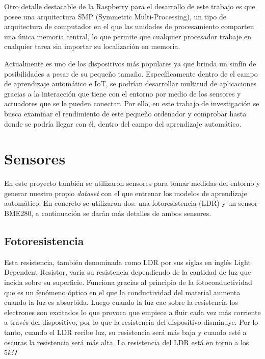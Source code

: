 \documentclass[a4paper, 12pt]{book}
\begin{document}
Otro detalle destacable de la Raspberry para el desarrollo de este trabajo es que posee una arquitectura SMP (Symmetric Multi-Processing), un tipo de arquitectura de computador en el que las unidades de procesamiento comparten una única memoria central, lo que permite que cualquier procesador trabaje en cualquier tarea sin importar su localización en memoria. 

Actualmente es uno de los dispositivos más populares ya que brinda un sinfín de posibilidades a pesar de su pequeño tamaño. Específicamente dentro de el campo de aprendizaje automático e IoT, se podrían desarrollar multitud de aplicaciones gracias a la interacción que tiene con el entorno por medio de los sensores y actuadores que se le pueden conectar. Por ello, en este trabajo de investigación se busca examinar el rendimiento de este pequeño ordenador y comprobar hasta donde se podría llegar con él, dentro del campo del aprendizaje automático. 


\section{Sensores}
\label{sec:sensores}

En este proyecto también se utilizaron sensores para tomar medidas del entorno y generar nuestro propio \textit{dataset} con el que entrenar los modelos de aprendizaje automático. En concreto se utilizaron dos: una fotoresistencia (LDR) y un sensor BME280, a continuación se darán más detalles de ambos sensores.

\subsection{Fotoresistencia}
\label{subsec:fotoresistencia}

Esta resistencia, también denominada como LDR por sus siglas en inglés Light Dependent Resistor, varia su resistencia dependiendo de la cantidad de luz que incida sobre su superficie. Funciona gracias al principio de la fotoconductividad que es un fenómeno óptico en el que la conductividad del material aumenta cuando la luz es absorbida. Luego cuando la luz cae sobre la resistencia los electrones son excitados lo que provoca que empiece a fluir cada vez más corriente a través del dispositivo, por lo que la resistencia del dispositivo disminuye. Por lo tanto, cuando el LDR recibe luz, su resistencia será más baja y cuando esté a oscuras la resistencia será más alta. La resistencia del LDR está en torno a los $5 k\Omega$
\end{document}
